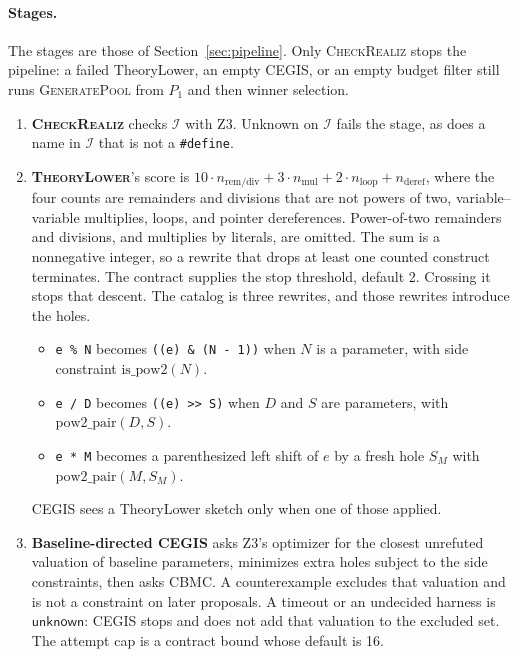 \paragraph{Stages.}
The stages are those of Section~\ref{sec:pipeline}. Only
\textsc{CheckRealiz} stops the pipeline: a failed TheoryLower, an empty
CEGIS, or an empty budget filter still runs \textsc{GeneratePool} from
\(P_1\) and then winner selection.
\begin{enumerate}
  \item \textbf{\textsc{CheckRealiz}} checks \(\mathcal{I}\) with Z3.
  Unknown on \(\mathcal{I}\) fails the stage, as does a name in
  \(\mathcal{I}\) that is not a \texttt{\#define}.

  \item \textbf{\textsc{TheoryLower}}'s score is
  \(10\cdot n_{\mathrm{rem/div}} + 3\cdot n_{\mathrm{mul}} + 2\cdot n_{\mathrm{loop}} + n_{\mathrm{deref}}\),
  where the four counts are remainders and divisions that are not powers
  of two, variable--variable multiplies, loops, and pointer dereferences.
  Power-of-two remainders and divisions, and multiplies by literals, are
  omitted. The sum is a nonnegative integer, so a rewrite that drops at
  least one counted construct terminates. The contract supplies the stop
threshold, default 2. Crossing it stops that descent. The catalog is three
rewrites, and those
  rewrites introduce the holes.
  \begin{itemize}
    \item \texttt{e \% N} becomes \texttt{((e) \& (N - 1))} when \(N\) is a
    parameter, with side constraint \(\mathrm{is\_pow2}(N)\).
    \item \texttt{e / D} becomes \texttt{((e) >> S)} when \(D\) and \(S\) are
    parameters, with \(\mathrm{pow2\_pair}(D,S)\).
    \item \texttt{e * M} becomes a parenthesized left shift of \(e\) by a
    fresh hole \(S_M\) with \(\mathrm{pow2\_pair}(M,S_M)\).
  \end{itemize}
  CEGIS sees a TheoryLower sketch only when one of those applied.

  \item \textbf{Baseline-directed CEGIS} asks Z3's optimizer for the
  closest unrefuted valuation of baseline parameters, minimizes extra
  holes subject to the side constraints, then asks CBMC. A counterexample
  excludes that valuation and is not a constraint on later proposals. A
  timeout or an undecided harness is \(\mathsf{unknown}\): CEGIS stops
  and does not add that valuation to the excluded set. The attempt cap is
  a contract bound whose default is 16.


\end{enumerate}

